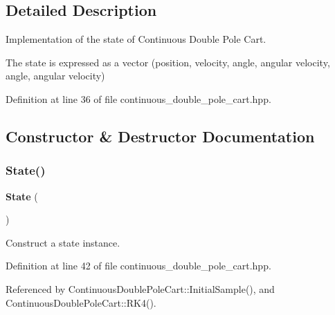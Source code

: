 \subsection{Detailed Description}
Implementation of the state of Continuous Double Pole Cart. 

The state is expressed as a vector (position, velocity, angle, angular velocity, angle, angular velocity) 

Definition at line 36 of file continuous\+\_\+double\+\_\+pole\+\_\+cart.\+hpp.



\subsection{Constructor \& Destructor Documentation}
\mbox{\label{classmlpack_1_1rl_1_1ContinuousDoublePoleCart_1_1State_a790355057d12e9c1ce7643551c16fecd}} 
\subsubsection{State()\hspace{0.1cm}{\footnotesize\ttfamily [1/2]}}
{\footnotesize\ttfamily \textbf{ State} (\begin{DoxyParamCaption}{ }\end{DoxyParamCaption})\hspace{0.3cm}{\ttfamily [inline]}}



Construct a state instance. 



Definition at line 42 of file continuous\+\_\+double\+\_\+pole\+\_\+cart.\+hpp.



Referenced by Continuous\+Double\+Pole\+Cart\+::\+Initial\+Sample(), and Continuous\+Double\+Pole\+Cart\+::\+R\+K4().

\mbox{\label{classmlpack_1_1rl_1_1ContinuousDoublePoleCart_1_1State_a8bc7967f6d91a3c94f9b3f502297a926}} 
